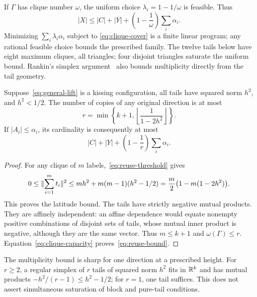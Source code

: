 If $\Gamma$ has clique number $\omega$, the uniform choice
$\lambda_i=1-1/\omega$ is feasible. Thus
\begin{equation}\label{eq:clique-capacity}
 |X|\le |C|+|Y|+
 \left(1-\frac1\omega\right)\sum_i\alpha_i.
\end{equation}
Minimizing $\sum_i\lambda_i\alpha_i$ subject to
\eqref{eq:clique-cover} is a finite linear program; any rational feasible
choice bounds the prescribed family. The twelve tails below have eight
maximum cliques, all triangles; four disjoint triangles saturate the
uniform bound. Rankin's simplex argument~\cite{rankin} also bounds
multiplicity directly from the tail geometry.

\begin{proposition}\label{prop:multiplicity}
Suppose~\eqref{eq:general-lift} is a kissing configuration, all tails
have squared norm $h^2$, and $h^2<1/2$. The number of copies of any
original direction is at most
\begin{equation}\label{eq:max-multiplicity}
 r=\min\left\{k+1,\left\lfloor\frac1{1-2h^2}\right\rfloor\right\}.
\end{equation}
If $|A_i|\le\alpha_i$, its cardinality is consequently at most
\begin{equation}\label{eq:reuse-bound}
 |C|+|Y|+\left(1-\frac1r\right)\sum_i\alpha_i.
\end{equation}
\end{proposition}
\begin{proof}
For any clique of $m$ labels,~\eqref{eq:reuse-threshold} gives
\[
 0\le\lVert \sum_{i=1}^{m}t_i\rVert^2
 \le mh^2+m(m-1)(h^2-1/2)
 =\frac m2\bigl(1-m(1-2h^2)\bigr).
\]
This proves the latitude bound. The tails have strictly negative mutual products.
They are affinely independent: an affine dependence would equate
nonempty positive combinations of disjoint sets of tails, whose mutual
inner product is negative, although they are the same vector.
Thus $m\le k+1$ and $\omega(\Gamma)\le r$.
Equation~\eqref{eq:clique-capacity} proves~\eqref{eq:reuse-bound}.
\end{proof}

The multiplicity bound is sharp for one direction at a prescribed
height. For $r\ge2$, a regular simplex of $r$ tails of squared norm
$h^2$ fits in $\mathbb R^k$ and has mutual products
$-h^2/(r-1)\le h^2-1/2$; for $r=1$, one tail suffices.
This does not assert simultaneous saturation of block and pure-tail
conditions.

